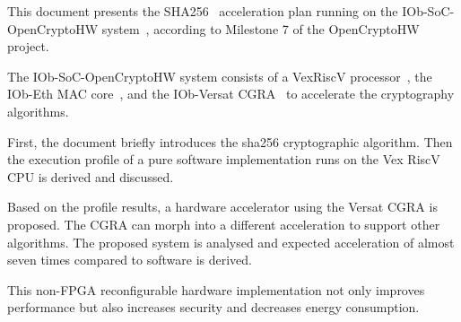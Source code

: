 This document presents the SHA256~\cite{SHA_NIST_FIPS} acceleration plan
running on the IOb-SoC-OpenCryptoHW system~\cite{iob-soc-sha}, according to
Milestone 7 of the OpenCryptoHW project.

The IOb-SoC-OpenCryptoHW system consists of a VexRiscV
processor~\cite{VexRiscv}, the IOb-Eth MAC core~\cite{iob-eth}, and the
IOb-Versat CGRA~\cite{iob-versat} to accelerate the cryptography algorithms.

First, the document briefly introduces the sha256 cryptographic algorithm. Then
the execution profile of a pure software implementation runs on the Vex RiscV
CPU is derived and discussed.

Based on the profile results, a hardware accelerator using the Versat CGRA is
proposed. The CGRA can morph into a different acceleration to support other
algorithms. The proposed system is analysed and expected acceleration of
almost seven times compared to software is derived.

This non-FPGA reconfigurable hardware implementation not only improves
performance but also increases security and decreases energy consumption.
